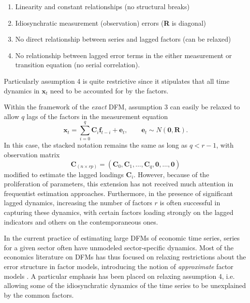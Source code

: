 \documentclass[a4paper]{article}
\begin{document}
\begin{enumerate}
\item Linearity and constant relationships (no structural breaks)
\item Idiosynchratic measurement (observation) errors (\textbf{R} is diagonal)
\item No direct relationship between series and lagged factors (can be relaxed)
\item No relationship between lagged error terms in the either measurement or transition equation (no serial correlation).
\end{enumerate}

Particularly assumption 4 is quite restrictive since it stipulates that all time dynamics in $\textbf{x}_t$ need to be accounted for by the factors. \newline

Within the framework of the \emph{exact} DFM, assumption 3 can easily be relaxed to allow $q$ lags of the factors in the measurement equation
\begin{equation}
\textbf{x}_t = \sum_{i=0}^q \textbf{C}_i \textbf{f}_{t-i} + \textbf{e}_t, \qquad \textbf{e}_t\sim N(\textbf{0}, \textbf{R}).
\end{equation}
In this case, the stacked notation remains the same as long as $q < r-1$, with observation matrix 
\begin{equation} \label{eq:Clags}
\textbf{C}_{(n \times rp)}  = (\textbf{C}_0, \textbf{C}_1, \dots, \textbf{C}_q, \textbf{0}, \dots, \textbf{0})
\end{equation}
modified to estimate the lagged loadings $\textbf{C}_i$. However, because of the proliferation of parameters, this extension has not received much attention in frequentist estimation approaches. Furthermore, in the presence of significant lagged dynamics, increasing the number of factors $r$ is often successful in capturing these dynamics, with certain factors loading strongly on the lagged indicators and others on the contemporaneous ones. \newline


In the current practice of estimating large DFMs of economic time series, series for a given sector often have unmodeled sector-specific dynamics. Most of the economics literature on DFMs has thus focused on relaxing restrictions about the error structure in factor models, introducing the notion of \emph{approximate} factor models \citep{stock2016dynamic}. A particular emphasis has been placed on relaxing assumption 4, i.e. allowing some of the idiosynchratic dynamics of the time series to be unexplained by the common factors. 
\end{document}
